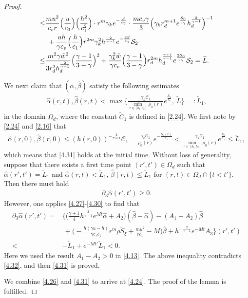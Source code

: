 \documentclass[11pt,reqno]{article}
\newcommand{\dps}{\displaystyle}
\newcommand{\fr}{\frac}
\newcommand{\pa}{\partial}
\numberwithin{equation}{section}
\begin{document}
\begin{proof}
\begin{align}
\leq & \fr{mu^2}{c_{v} r} \Big(\fr{u}{c_3}\Big)\Big(\fr{h^2}{c_{1}^2}\Big)\cdot r^m \gamma_k e^{-\fr{S}{c_\gamma}}\cdot \fr{mc_v\gamma}{3}\Big(\gamma_k r_{d}^{m+1}e^{\fr{\mathcal{S}_0}{c_\gamma}}h_{d}^{\fr{2}{\gamma-1}}\Big)^{-1} \notag \\
&\ +\fr{uh}{\gamma c_v} \Big(\fr{h}{c_1}\Big)r^{2m}\gamma_{k}^2h^{\fr{2}{\gamma-1}} e^{-\fr{2S}{c_\gamma}}\mathcal{S}_2 \notag \\
\leq & \fr{m^2\gamma \tilde{w}^2}{3r_{d}^2h_{d}^{\fr{2}{\gamma-1}}} \Big(\fr{\gamma-1}{3-\gamma}\Big)^2 +\fr{\gamma_{k}^2\tilde{w}}{\gamma c_v }\Big(\fr{\gamma-1}{3-\gamma}\Big)r_{d}^{2m}h_{d}^{\fr{\gamma+1}{\gamma-1}} e^{\fr{2\mathcal{S}_0}{c_\gamma}}\mathcal{S}_2 =\widetilde{L}.
\end{align}

We next claim that $(\hat\alpha, \hat\beta)$ satisfy the following estimates
\begin{align}\label{4.31}
\hat\alpha(r,t), \hat\beta(r,t)<\max\bigg\{\fr{\gamma_k\mathcal{C}_1}{\dps\min_{r\in[b_1,b_2]}\rho_0(r)} e^{\fr{\mathcal{S}_0}{c_\gamma}},\ \widetilde{L}\bigg\}=: \widetilde{L}_1,
\end{align}
in the domain $\Omega_d$, where the constant $\widetilde{C}_1$ is defined in \eqref{2.24}. We first note by \eqref{2.24} and \eqref{2.16} that
\begin{align*}
\hat\alpha(r,0),\hat\beta(r,0)\leq (h(r,0))^{-\fr{2}{\gamma-1}}\mathcal{C}_1 = \fr{\gamma_k \mathcal{C}_1}{\rho_0(r)}e^{-\fr{S_0(r)}{c_\gamma}} <\fr{\gamma_k\mathcal{C}_1}{\dps\min_{r\in[b_1,b_2]}\rho_0(r)} e^{\fr{\mathcal{S}_0}{c_\gamma}}\leq \widetilde{L}_1,
\end{align*}
which means that \eqref{4.31} holds at the initial time. Without loss of generality, suppose that there exists a first time point $(r',t')\in\Omega_d$ such that $\hat\alpha(r',t')=\widetilde{L}_1$ and $\hat\alpha(r,t)<\widetilde{L}_1$, $\hat\beta(r,t)\leq\widetilde{L}_1$ for $(r,t)\in\Omega_d\cap\{t<t'\}$. Then there must hold
\begin{align}\label{4.32}
\pa_3\hat\alpha(r',t')\geq0.
\end{align}
However, one applies \eqref{4.27}-\eqref{4.30} to find that
\begin{align*}
\pa_3 \hat{\alpha}(r',t') =& \bigg\{\Big(\fr{\gamma+1}{4}h^{\fr{2}{\gamma-1}}e^{Mt}\hat{\alpha} +A_2\Big)(\hat\beta-\hat\alpha) -(A_1-A_2)\hat\beta \\
&\ +\Big(-\fr{h(\gamma u-h)}{\gamma c_\gamma c_1}r^m\rho \widetilde{S}_\xi +\fr{mu^2}{rc_1}-M\Big)\hat\beta +h^{-\fr{2}{\gamma-1}}e^{-Mt}A_3\bigg\}(r',t') \\
< & -\widetilde{L}_1 +e^{-Mt'}\widetilde{L}_1<0.
\end{align*}
Here we used the result $A_1-A_2>0$ in \eqref{4.13}. The above inequality contradicts \eqref{4.32}, and then \eqref{4.31} is proved.

We combine \eqref{4.26} and \eqref{4.31} to arrive at \eqref{4.24}. The proof of the lemma is fulfilled.
\end{proof}
\end{document}
